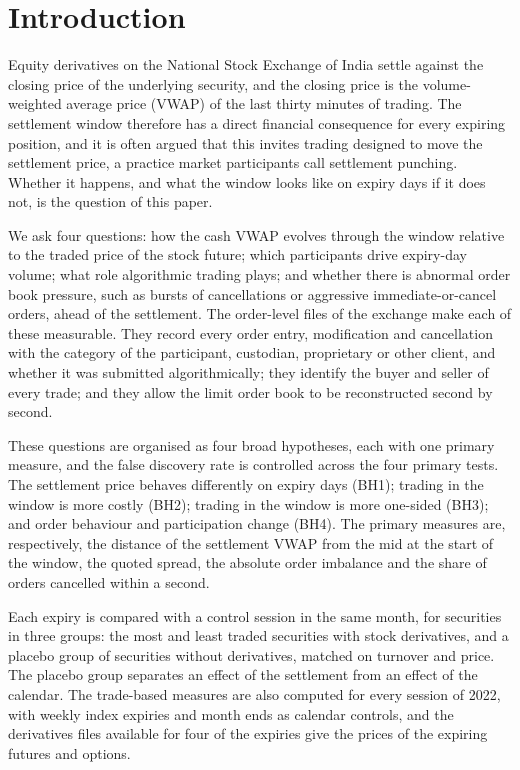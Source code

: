 \section{Introduction}\label{sec:intro}

Equity derivatives on the National Stock Exchange of India settle against the closing price of
the underlying security, and the closing price is the volume-weighted average price (VWAP) of
the last thirty minutes of trading. The settlement window therefore has a direct financial
consequence for every expiring position, and it is often argued that this invites trading
designed to move the settlement price, a practice market participants call settlement punching.
Whether it happens, and what the window looks like on expiry days if it does not, is the
question of this paper.

We ask four questions: how the cash VWAP evolves through the window relative to the traded
price of the stock future; which participants drive expiry-day volume; what role algorithmic
trading plays; and whether there is abnormal order book pressure, such as bursts of
cancellations or aggressive immediate-or-cancel orders, ahead of the settlement. The
order-level files of the exchange make each of these measurable. They record every order entry,
modification and cancellation with the category of the participant, custodian, proprietary or
other client, and whether it was submitted algorithmically; they identify the buyer and seller
of every trade; and they allow the limit order book to be reconstructed second by second.

These questions are organised as four broad hypotheses, each with one primary measure, and
the false discovery rate is controlled across the four primary tests. The settlement price behaves differently on expiry days (BH1);
trading in the window is more costly (BH2); trading in the window is more one-sided (BH3); and
order behaviour and participation change (BH4). The primary measures are, respectively, the
distance of the settlement VWAP from the mid at the start of the window, the quoted spread, the absolute order
imbalance and the share of orders cancelled within a second.

Each expiry is compared with a control session in the same month, for \DesignSymbols{} securities
in three groups: the most and least traded securities with stock derivatives, and a placebo group
of securities without derivatives, matched on turnover and price. The placebo group separates an
effect of the settlement from an effect of the calendar. The trade-based measures are also
computed for every session of 2022, with weekly index expiries and month ends as calendar
controls, and the derivatives files available for four of the expiries give the prices of the
expiring futures and options.

